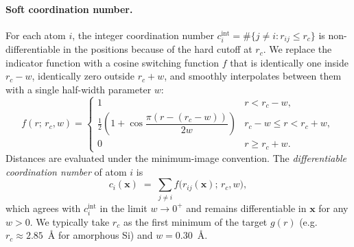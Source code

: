 \paragraph{Soft coordination number.}
For each atom $i$, the integer coordination number
$c_i^{\mathrm{int}}=\#\{j\neq i: r_{ij}\le r_c\}$ is non-differentiable in the
positions because of the hard cutoff at $r_c$. We replace the indicator
function with a cosine switching function $f$ that is identically one inside
$r_c-w$, identically zero outside $r_c+w$, and smoothly interpolates between
them with a single half-width parameter $w$:
\begin{equation}
    f(r;\,r_c,w)
    =
    \begin{cases}
        1                                                        & r < r_c - w,\\[2pt]
        \tfrac{1}{2}\!\left(1 + \cos\!\dfrac{\pi(r - (r_c - w))}{2w}\right) & r_c - w \le r < r_c + w,\\[8pt]
        0                                                        & r \ge r_c + w.
    \end{cases}
    \label{eq:cosine-switch}
\end{equation}
Distances are evaluated under the minimum-image convention. The
\emph{differentiable coordination number} of atom $i$ is
\begin{equation}
    c_i(\mathbf{x})
    \;=\; \sum_{j\neq i} f\!\big(r_{ij}(\mathbf{x});\,r_c,w\big),
    \label{eq:soft-coord}
\end{equation}
which agrees with $c_i^{\mathrm{int}}$ in the limit $w\to 0^{+}$ and remains
differentiable in $\mathbf{x}$ for any $w>0$. We typically take $r_c$ as the
first minimum of the target $g(r)$ (e.g.\ $r_c\approx 2.85$~\AA{} for
amorphous Si) and $w=0.30$~\AA.

